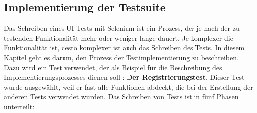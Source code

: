 \subsection{Implementierung der Testsuite}

Das Schreiben eines UI-Tests mit Selenium ist ein Prozess, der je
nach der zu testenden Funktionalität mehr oder weniger lange dauert.
Je komplexer die Funktionalität ist, desto komplexer ist auch das
Schreiben des Tests. In diesem Kapitel geht es darum, den Prozess
der Testimplementierung zu beschreiben. Dazu wird ein Test verwendet,
der als Beispiel für die Beschreibung des Implementierungsprozesses
dienen soll : \textbf{Der Registrierungstest}. Dieser Test wurde ausgewählt,
weil er fast alle Funktionen abdeckt, die bei der Erstellung der
anderen Tests verwendet wurden. Das Schreiben von Tests ist in fünf
Phasen unterteilt:






